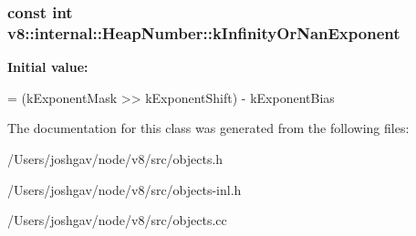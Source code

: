 \subsubsection[{\texorpdfstring{k\+Infinity\+Or\+Nan\+Exponent}{kInfinityOrNanExponent}}]{\setlength{\rightskip}{0pt plus 5cm}const int v8\+::internal\+::\+Heap\+Number\+::k\+Infinity\+Or\+Nan\+Exponent\hspace{0.3cm}{\ttfamily [static]}}\hypertarget{classv8_1_1internal_1_1_heap_number_a35bb7c72d798b1e4c47339a61dfa1f33}{}\label{classv8_1_1internal_1_1_heap_number_a35bb7c72d798b1e4c47339a61dfa1f33}
{\bfseries Initial value\+:}
\begin{DoxyCode}
=
      (kExponentMask >> kExponentShift) - kExponentBias
\end{DoxyCode}


The documentation for this class was generated from the following files\+:\begin{DoxyCompactItemize}
\item 
/\+Users/joshgav/node/v8/src/objects.\+h\item 
/\+Users/joshgav/node/v8/src/objects-\/inl.\+h\item 
/\+Users/joshgav/node/v8/src/objects.\+cc\end{DoxyCompactItemize}
